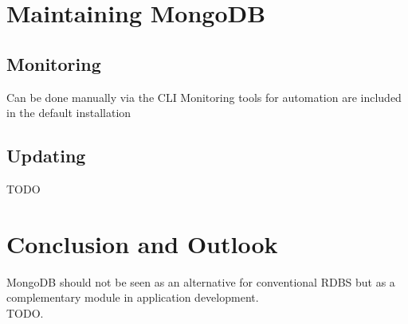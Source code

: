 \section{Maintaining MongoDB}
\label{sec:maintenance}

\subsection{Monitoring}
\label{sec:maintenance-monitroing}
Can be done manually via the CLI
Monitoring tools for automation are included in the default installation

\subsection{Updating}
\label{sec:maintenance-updating}
TODO




\newpage
\section{Conclusion and Outlook}
\label{sec:conclusion}

MongoDB should not be seen as an alternative for conventional RDBS but as a
complementary module in application development.\\
TODO.



